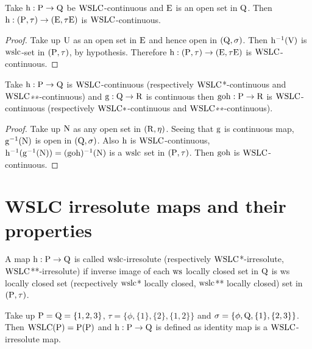 \begin{thm}\label{thm6.3.15}
Take $\mathrm{h} : \mathrm{P} \to \mathrm{Q}$ be $\mathrm{WSLC}$-continuous and $\mathrm{E}$ is an open set in $\mathrm{Q}$. Then $\mathrm{h} : (\mathrm{P}, \tau) \to (\mathrm{E}, \tau \mathrm{E})$ is $\mathrm{WSLC}$-continuous.
\end{thm}

\begin{proof}
Take up $\mathrm{U}$ as an open set in $\mathrm{E}$ and hence open in $(\mathrm{Q}, \sigma)$. Then $\mathrm{h}^{-1} (\mathrm{V})$ is $\mathrm{ws}\mathrm{lc}$-set in $(\mathrm{P}, \tau)$, by hypothesis. Therefore $\mathrm{h} : (\mathrm{P}, \tau) \to (\mathrm{E}, \tau \mathrm{E})$ is $\mathrm{WSLC}$-continuous.
\end{proof}

\begin{thm}\label{thm6.3.16}
Take $\mathrm{h}: \mathrm{P} \to \mathrm{Q}$ is $\mathrm{WSLC}$-continuous (respectively $\mathrm{WSLC}$*-{\break}continuous and $\mathrm{WSLC}${∗}{∗}-continuous) and $\mathrm{g}: \mathrm{Q} \to \mathrm{R}$ is continuous then $\mathrm{goh} : \mathrm{P} \to \mathrm{R}$ is $\mathrm{WSLC}$-continuous (respectively $\mathrm{WSLC}*$-continuous and $\mathrm{WSLC}${∗}{∗}-continuous).
\end{thm}

\begin{proof}
Take up $\mathrm{N}$ as any open set in $(\mathrm{R}, \eta)$. Seeing that $\mathrm{g}$ is continuous map, $\mathrm{g}^{-1} (\mathrm{N})$ is open in $(\mathrm{Q}, \sigma)$. Also $\mathrm{h}$ is $\mathrm{WSLC}$-continuous, $\mathrm{h}^{-1} (\mathrm{g}^{-1} (\mathrm{N})) = (\mathrm{goh})^{-1} (\mathrm{N})$ is a $\mathrm{ws}\mathrm{lc}$ set in $(\mathrm{P}, \tau)$. Then $\mathrm{goh}$ is $\mathrm{WSLC}$-continuous.
\end{proof}

\section{WSLC irresolute maps and their properties}\label{sec6.4}

\begin{dfn}\label{defi6.4.1}
A map $\mathrm{h}: \mathrm{P} \to \mathrm{Q}$ is called $\mathrm{ws}\mathrm{lc}$-irresolute (respectively $\mathrm{WSLC}$*-irresolute, $\mathrm{WSLC}${*}{*}-irresolute) if inverse image of each $\mathrm{ws}$ locally closed set in $\mathrm{Q}$ is ws locally closed set (recpectively $\mathrm{ws}\mathrm{lc}${*} locally closed, $\mathrm{ws}\mathrm{lc}${*}{*} locally closed) set in $(\mathrm{P}, \tau)$.
\end{dfn}

\begin{exm}\label{exam6.4.2}
Take up $\mathrm{P} = \mathrm{Q} = \{1,2, 3\}$, $\tau = \{\phi, \{1\}, \{2\}, \{1,2\}\}$ and $\sigma = \{\phi, \mathrm{Q}, \{1\}, \{2, 3\}\}$. Then $\mathrm{WSLC}(\mathrm{P}) = \mathrm{P} (\mathrm{P})$ and $\mathrm{h}: \mathrm{P} \to \mathrm{Q}$ is defined as identity map is a $\mathrm{WSLC}$-irresolute map.
\end{exm}

